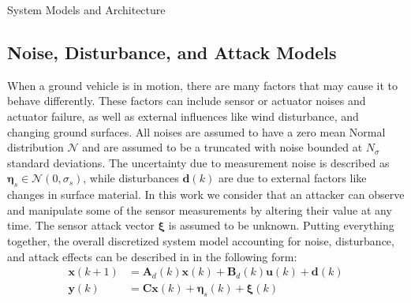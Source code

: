 \begin{section}{System Models and Architecture}
 \subsection{Noise, Disturbance, and Attack Models}
When a ground vehicle is in motion, there are many factors that may cause it to behave differently. These factors can include sensor or actuator noises and actuator failure, as well as external influences like wind disturbance, and changing ground surfaces. All noises are assumed to have a zero mean Normal distribution $\mathcal{N}$ and are assumed to be a truncated with noise bounded at $N_{\sigma}$ standard deviations. The uncertainty due to measurement noise is described as $\bm{\eta}_s \in \mathcal{N}(0,\sigma_s)$, while disturbances $\bm{d}(k)$ are due to external factors like changes in surface material. In this work we consider that an attacker can observe and manipulate some of the sensor measurements by altering their value at any time. The sensor attack vector $\bm{\xi}$ is assumed to be unknown. Putting everything together, the overall discretized system model accounting for noise, disturbance, and attack effects can be described in in the following form:
    \begin{equation}
    \begin{split}
    \label{eq:discrete_SS}
	\bm{x}(k+1)&=\bm{A}_d(k)\bm{x}(k)+\bm{B}_d(k)\bm{u}(k)+\bm{d}(k) \\
	\bm{y}(k)&=\bm{C}\bm{x}(k)+\bm{\eta}_s(k)+\bm{\xi}(k)
	\end{split}
	\end{equation}




\end{section}
